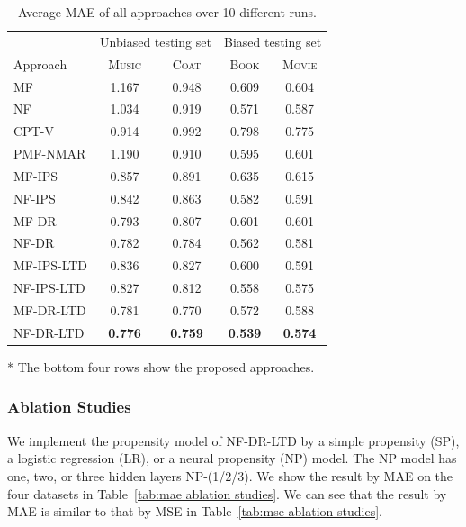 \documentclass[letterpaper]{article} %
\begin{document}
\begin{table}[h]
\small
\centering
\caption{Average MAE of all approaches over 10 different runs.}
\label{tab:mae overall results}
\begin{threeparttable}
\begin{tabular}{l|cc||cc}
\toprule
& \multicolumn{2}{c||}{Unbiased testing set} & \multicolumn{2}{c}{Biased testing set} \\
\cmidrule(rl){2-5}
Approach & \textsc{Music} & \textsc{Coat} & \textsc{Book} & \textsc{Movie} \\
\midrule
MF & 1.167 & 0.948 & 0.609 & 0.604 \\
NF & 1.034 & 0.919 & 0.571 & 0.587 \\
\midrule
CPT-V & 0.914 & 0.992 & 0.798 & 0.775 \\
PMF-NMAR & 1.190 & 0.910 & 0.595 & 0.601 \\
MF-IPS & 0.857 & 0.891 & 0.635 & 0.615 \\
NF-IPS & 0.842 & 0.863 & 0.582 & 0.591 \\
MF-DR & 0.793 & 0.807 & 0.601 & 0.601 \\
NF-DR & 0.782 & 0.784 & 0.562 & 0.581 \\
\midrule
MF-IPS-LTD & 0.836 & 0.827 & 0.600 & 0.591 \\
NF-IPS-LTD & 0.827 & 0.812 & 0.558 & 0.575 \\
MF-DR-LTD & 0.781 & 0.770 & 0.572 & 0.588 \\
NF-DR-LTD & \textbf{0.776} & \textbf{0.759} & \textbf{0.539} & \textbf{0.574} \\
\bottomrule
\end{tabular}
\begin{tablenotes}[flushleft]
\footnotesize
\item[*] The bottom four rows show the proposed approaches.
\end{tablenotes}
\end{threeparttable}
\end{table}

\subsubsection{Ablation Studies}
We implement the propensity model of NF-DR-LTD by a simple propensity (SP), a logistic regression (LR), or a neural propensity (NP) model.
The NP model has one, two, or three hidden layers NP-(1/2/3).
We show the result by MAE on the four datasets in Table~\ref{tab:mae ablation studies}.
We can see that the result by MAE is similar to that by MSE in Table~\ref{tab:mse ablation studies}.
\end{document}
